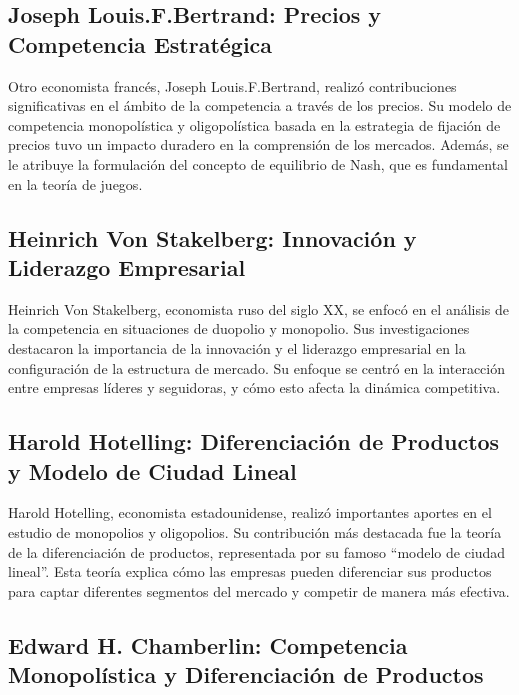 \documentclass[
  doc,
  floatsintext,
  longtable,
  a4paper,
  nolmodern,
  notxfonts,
  notimes,
  12pt,
  colorlinks=true,linkcolor=blue,citecolor=blue,urlcolor=blue]{apa7}
\begin{document}
\subsection{Joseph Louis.F.Bertrand: Precios y Competencia
Estratégica}\label{joseph-louis.f.bertrand-precios-y-competencia-estratuxe9gica}

Otro economista francés, Joseph Louis.F.Bertrand, realizó contribuciones
significativas en el ámbito de la competencia a través de los precios.
Su modelo de competencia monopolística y oligopolística basada en la
estrategia de fijación de precios tuvo un impacto duradero en la
comprensión de los mercados. Además, se le atribuye la formulación del
concepto de equilibrio de Nash, que es fundamental en la teoría de
juegos.

\subsection{Heinrich Von Stakelberg: Innovación y Liderazgo
Empresarial}\label{heinrich-von-stakelberg-innovaciuxf3n-y-liderazgo-empresarial}

Heinrich Von Stakelberg, economista ruso del siglo XX, se enfocó en el
análisis de la competencia en situaciones de duopolio y monopolio. Sus
investigaciones destacaron la importancia de la innovación y el
liderazgo empresarial en la configuración de la estructura de mercado.
Su enfoque se centró en la interacción entre empresas líderes y
seguidoras, y cómo esto afecta la dinámica competitiva.

\subsection{Harold Hotelling: Diferenciación de Productos y Modelo de
Ciudad
Lineal}\label{harold-hotelling-diferenciaciuxf3n-de-productos-y-modelo-de-ciudad-lineal}

Harold Hotelling, economista estadounidense, realizó importantes aportes
en el estudio de monopolios y oligopolios. Su contribución más destacada
fue la teoría de la diferenciación de productos, representada por su
famoso ``modelo de ciudad lineal''. Esta teoría explica cómo las
empresas pueden diferenciar sus productos para captar diferentes
segmentos del mercado y competir de manera más efectiva.

\subsection{Edward H. Chamberlin: Competencia Monopolística y
Diferenciación de
Productos}\label{edward-h.-chamberlin-competencia-monopoluxedstica-y-diferenciaciuxf3n-de-productos}
\end{document}
